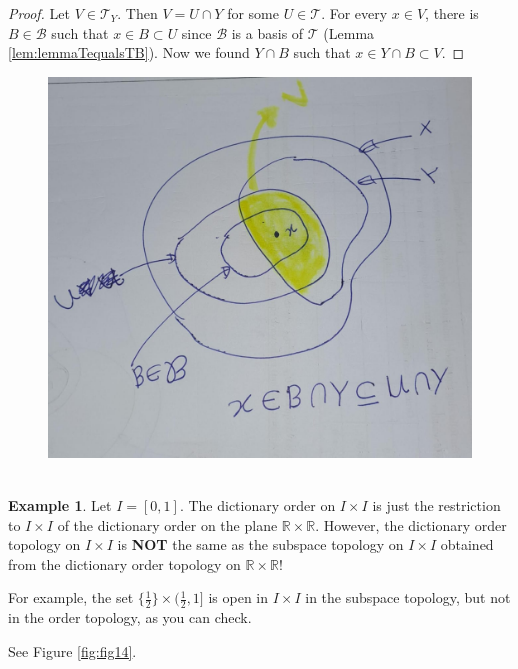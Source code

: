 \documentclass[
]{book}
\theoremstyle{definition}
\theoremstyle{definition}
\newtheorem{example}{Example}[chapter]
\theoremstyle{definition}
\theoremstyle{definition}
\theoremstyle{remark}
\begin{document}
\begin{proof}
Let \(V\in \mathcal{T}_Y\). Then \(V=U\cap Y\) for some \(U\in \mathcal{T}\). For every \(x \in V\), there is \(B \in \mathcal{B}\) such that \(x \in B \subset U\) since \(\mathcal{B}\) is a basis of \(\mathcal{T}\) (Lemma \ref{lem:lemmaTequalsTB}). Now we found \(Y \cap B\) such that \(x \in Y \cap B \subset V\).
\end{proof}

\begin{figure}
\centering
\includegraphics{figures/figure 13.jpg}
\caption{\label{fig:fig13}\(~\)}
\end{figure}

\begin{example}
\protect\hypertarget{exm:unnamed-chunk-47}{}\label{exm:unnamed-chunk-47}Let \(I = [0, 1]\). The dictionary order on \(I \times I\) is just the restriction to \(I \times I\) of the dictionary order on the plane \(\mathbb{R} \times \mathbb{R}\). However, the dictionary order topology on \(I \times I\) is \textbf{NOT} the same as the subspace topology on \(I \times I\) obtained from the dictionary order topology on \(\mathbb{R} \times \mathbb{R}\)!

For example, the set \(\{\frac{1}{2}\} \times (\frac{1}{2}, 1]\) is open in \(I \times I\) in the
subspace topology, but not in the order topology, as you can check.

See Figure \ref{fig:fig14}.
\end{example}
\end{document}
